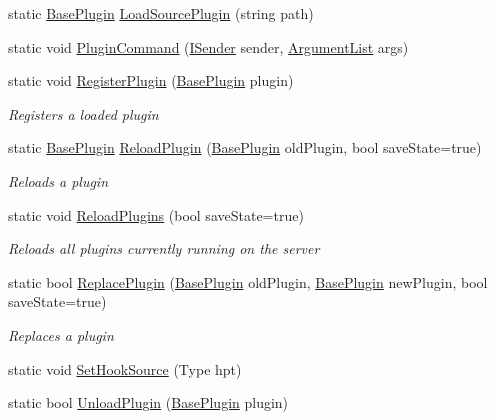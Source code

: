\begin{DoxyCompactItemize}
static \hyperlink{classOTA_1_1Plugin_1_1BasePlugin}{Base\+Plugin} \hyperlink{classOTA_1_1PluginManager_a2e43f333f61e81e1d4d3d1e1a06db415}{Load\+Source\+Plugin} (string path)
\item 
static void \hyperlink{classOTA_1_1PluginManager_a1c4f61cb3323a6bf9cb8e313d5fdb8fb}{Plugin\+Command} (\hyperlink{interfaceOTA_1_1Command_1_1ISender}{I\+Sender} sender, \hyperlink{classOTA_1_1Command_1_1ArgumentList}{Argument\+List} args)
\item 
static void \hyperlink{classOTA_1_1PluginManager_a66086313a6848fbdc018dbe5a2873c55}{Register\+Plugin} (\hyperlink{classOTA_1_1Plugin_1_1BasePlugin}{Base\+Plugin} plugin)
\begin{DoxyCompactList}\small\item\em Registers a loaded plugin \end{DoxyCompactList}\item 
static \hyperlink{classOTA_1_1Plugin_1_1BasePlugin}{Base\+Plugin} \hyperlink{classOTA_1_1PluginManager_afe24a86d7a7d903d3e72861404d7bce5}{Reload\+Plugin} (\hyperlink{classOTA_1_1Plugin_1_1BasePlugin}{Base\+Plugin} old\+Plugin, bool save\+State=true)
\begin{DoxyCompactList}\small\item\em Reloads a plugin \end{DoxyCompactList}\item 
static void \hyperlink{classOTA_1_1PluginManager_ad33a4455e3dd481611d1a75e723067cd}{Reload\+Plugins} (bool save\+State=true)
\begin{DoxyCompactList}\small\item\em Reloads all plugins currently running on the server \end{DoxyCompactList}\item 
static bool \hyperlink{classOTA_1_1PluginManager_ad4471e30149a441088ad15c908625116}{Replace\+Plugin} (\hyperlink{classOTA_1_1Plugin_1_1BasePlugin}{Base\+Plugin} old\+Plugin, \hyperlink{classOTA_1_1Plugin_1_1BasePlugin}{Base\+Plugin} new\+Plugin, bool save\+State=true)
\begin{DoxyCompactList}\small\item\em Replaces a plugin \end{DoxyCompactList}\item 
static void \hyperlink{classOTA_1_1PluginManager_a04bc5c491d3a4d2225317b73027ea46c}{Set\+Hook\+Source} (Type hpt)
\item 
static bool \hyperlink{classOTA_1_1PluginManager_a86478a917f0af4d0e3825d763651a784}{Unload\+Plugin} (\hyperlink{classOTA_1_1Plugin_1_1BasePlugin}{Base\+Plugin} plugin)
\end{DoxyCompactItemize}
